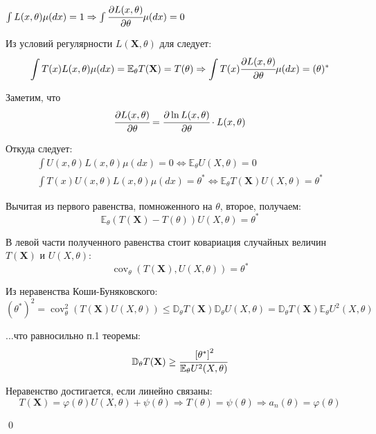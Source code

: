 \documentclass[oneside,final,14pt]{extreport}
\renewenvironment{proof}{{\bfseries Доказательство.}}{\qed}
\theoremstyle{definition}
\begin{document}
\begin{proof}
$\int L(x, \theta) \mu(d x)=1 \Rightarrow \int \cfrac{\partial L(x, \theta)}{\partial \theta} \mu(d x)=0$

Из условий регулярности $L(\mathbf{X}, \theta)$ для следует:
\begin{equation*}
    \int T(x) L(x, \theta) \mu(d x)=\mathbb{E}_{\theta} T(\mathbf{X})=T(\theta) \Rightarrow \int T(x) \cfrac{\partial L(x, \theta)}{\partial \theta} \mu(d x)=(\theta)^{*}
\end{equation*}

Заметим, что
\begin{equation*}
    \cfrac{\partial L(x, \theta)}{\partial \theta}=\cfrac{\partial \ln L(x, \theta)}{\partial \theta} \cdot L(x, \theta)
\end{equation*}

Откуда следует:
\begin{gather*}
    \int U(x, \theta) L(x, \theta) \mu(d x)=0 \Leftrightarrow \mathbb{E}_{\theta} U(X, \theta)=0 \\
\int T(x) U(x, \theta) L(x, \theta) \mu(d x)=\theta^{*} \Leftrightarrow \mathbb{E}_{\theta} T(\mathbf{X}) U(X, \theta)=\theta^{*}
\end{gather*}

Вычитая из первого равенства, помноженного на $\theta$, второе, получаем:
\begin{equation*}
    \mathbb{E}_{\theta}(T(\mathbf{X})-T(\theta)) U(X, \theta)=\theta^{*}
\end{equation*}

В левой части полученного равенства стоит ковариация случайных величин $T(\mathbf{X})$ и $U(X,\theta)$:
\begin{equation*}
    \operatorname{cov}_{\theta}(T(\mathbf{X}), U(X, \theta))=\theta^{*}
\end{equation*}

Из неравенства Коши-Буняковского:
\begin{equation*}
    \left(\theta^{*}\right)^{2}=\operatorname{cov}_{\theta}^{2}(T(\mathbf{X}) U(X, \theta)) \leqslant \mathbb{D}_{\theta} T(\mathbf{X}) \mathbb{D}_{\theta} U(X, \theta)=\mathbb{D}_{\theta} T(\mathbf{X}) \mathbb{E}_{\theta} U^{2}(X, \theta)
\end{equation*}

...что равносильно п.1 теоремы:
\begin{equation*}
    \mathbb{D}_{\theta} T(\mathbf{X}) \geq \cfrac{\left[\theta^{*}\right]^{2}}{\mathbb{E}_{\theta} U^{2}(X, \theta)}
\end{equation*}

Неравенство достигается, если линейно связаны:
\begin{equation*}
    T(\mathbf{X})=\varphi(\theta) U(X, \theta)+\psi(\theta) \Rightarrow T(\theta)=\psi(\theta) \Rightarrow a_{n}(\theta)=\varphi(\theta)
\end{equation*}

\end{proof}
\end{document}
